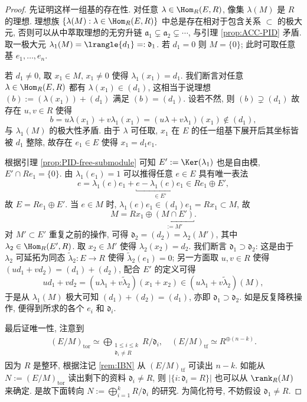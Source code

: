 \begin{proof}
	先证明这样一组基的存在性. 对任意 $\lambda \in \Hom_R(E, R)$, 像集 $\lambda(M)$ 是 $R$ 的理想. 理想族 $\{ \lambda(M): \lambda \in \Hom_R(E, R) \}$ 中总是存在相对于包含关系 $\subset$ 的极大元, 否则可以从中萃取理想的无穷升链 $\mathfrak{a}_1 \subsetneq \mathfrak{a}_2 \subsetneq \cdots$, 与引理 \ref{prop:ACC-PID} 矛盾. 取一极大元 $\lambda_1(M) = \lrangle{d_1} =: \mathfrak{d}_1$. 若 $d_1 = 0$ 则 $M=\{0\}$; 此时可取任意基 $e_1, \ldots, e_n$.

	若 $d_1 \neq 0$, 取 $x_1 \in M$, $x_1 \neq 0$ 使得 $\lambda_1(x_1) = d_1$. 我们断言对任意 $\lambda \in \Hom_R(E, R)$ 都有 $\lambda(x_1) \in (d_1)$, 这相当于说理想 $(b) := (\lambda(x_1)) + (d_1)$ 满足 $(b)=(d_1)$. 设若不然, 则 $(b) \supsetneq (d_1)$ 故存在 $u, v \in R$ 使得
	\[ b = u\lambda(x_1) + v\lambda_1(x_1) = (u\lambda + v\lambda_1)(x_1) \notin (d_1), \]
	与 $\lambda_1(M)$ 的极大性矛盾. 由于 $\lambda$ 可任取, $x_1$ 在 $E$ 的任一组基下展开后其坐标皆被 $d_1$ 整除, 故存在 $e_1 \in E$ 使得 $x_1 = d_1 e_1$.

	根据引理 \ref{prop:PID-free-submodule} 可知 $E' := \Ker(\lambda_1)$ 也是自由模, $E' \cap Re_1 = \{0\}$. 由 $\lambda_1(e_1) = 1$ 可以推得任意 $e \in E$ 具有唯一表法
	\[ e = \lambda_1(e) e_1 + \underbracket{e - \lambda_1(e)e_1}_{\in E'} \in R e_1 \oplus E', \]
	故 $E = R e_1 \oplus E'$. 当 $e \in M$ 时, $\lambda_1(e) e_1 \in (d_1) e_1 = R x_1 \subset M$, 故
	\[ M = Rx_1 \oplus \underbracket{(M \cap E')}_{:= M'}. \]
	对 $M' \subset E'$ 重复之前的操作, 可得 $\mathfrak{d}_2 = (d_2) = \lambda_2(M')$, 其中 $\lambda_2 \in \Hom_R(E', R)$. 取 $x_2 \in M'$ 使得 $\lambda_2(x_2) = d_2$. 我们断言 $\mathfrak{d}_1 \supset \mathfrak{d}_2$: 这是由于 $\lambda_2$ 可延拓为同态 $\tilde{\lambda}_2: E \to R$ 使得 $\tilde{\lambda}_2(e_1)=0$; 另一方面取 $u,v \in R$ 使得 $(ud_1 + vd_2) = (d_1) + (d_2)$, 配合 $E'$ 的定义可得
	\[ ud_1 + vd_2 = (u \lambda_1 + v\tilde{\lambda}_2)(x_1 + x_2) \in (u \lambda_1 + v\tilde{\lambda}_2)(M), \]
	于是从 $\lambda_1(M)$ 极大可知 $(d_1) + (d_2) = (d_1)$, 亦即 $\mathfrak{d}_1 \supset \mathfrak{d}_2$. 如是反复降秩操作, 便得到所求的各个 $e_i$ 和 $\mathfrak{d}_i$.

	最后证唯一性, 注意到
	\begin{gather*}
		(E/M)_\text{tor} \simeq \bigoplus_{\substack{1 \leq i \leq k \\ \mathfrak{d}_i \neq R}} R/\mathfrak{d}_i, \quad (E/M)_\text{tf} \simeq R^{\oplus (n-k)}.
	\end{gather*}
	因为 $R$ 是整环, 根据注记 \ref{rem:IBN} 从 $(E/M)_\text{tf}$ 可读出 $n-k$. 如能从 $N := (E/M)_\text{tor}$ 读出剩下的资料 $\mathfrak{d}_i \neq R$, 则 $|\{i: \mathfrak{d}_i = R \}|$ 也可以从 $\rank_R(M)$ 来确定. 是故下面转向 $N := \bigoplus_{i=1}^k R/\mathfrak{d}_i$ 的研究. 为简化符号, 不妨假设 $\mathfrak{d}_1 \neq R$.


\end{proof}

